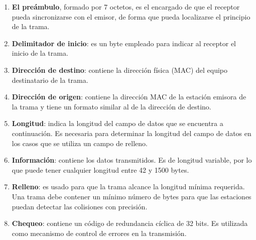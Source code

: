 \documentclass[a4paper]{article}
\begin{document}
	\begin{enumerate}
		\item \textbf{El preámbulo}, formado por 7 octetos, es el encargado de que el receptor pueda sincronizarse con el emisor, de forma que pueda localizarse el principio de la trama.
		
		\item \textbf{Delimitador de inicio}: es un byte empleado para indicar al receptor el inicio de la trama.
		
		\item \textbf{Dirección de destino}: contiene la dirección física (MAC) del equipo destinatario de la trama.
		
		\item \textbf{Dirección de origen}: contiene la dirección MAC de la estación emisora de la trama y tiene un formato similar al de la dirección de destino.
		
		\item \textbf{Longitud}: indica la longitud del campo de datos que se encuentra a continuación. Es necesaria para determinar la longitud del campo de datos en los casos que se utiliza un campo de relleno.
		
		\item \textbf{Información}: contiene los datos transmitidos. Es de longitud variable, por lo que puede tener cualquier longitud entre 42 y 1500 bytes.
		
		\item \textbf{Relleno}: es usado para que la trama alcance la longitud mínima requerida. Una trama debe contener un mínimo número de bytes para que las estaciones puedan detectar las colisiones con precisión.
		
		\item \textbf{Chequeo}: contiene un código de redundancia cíclica de 32 bits. Es utilizada como mecanismo de control de errores en la transmisión.
	\end{enumerate}
	
\end{document}
